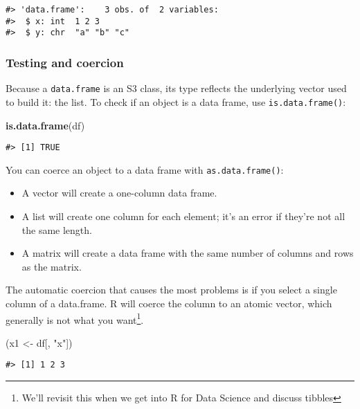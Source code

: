 \documentclass[]{book}
\newenvironment{Shaded}{\begin{snugshade}}{\end{snugshade}}
\newcommand{\KeywordTok}[1]{\textcolor[rgb]{0.13,0.29,0.53}{\textbf{#1}}}
\newcommand{\StringTok}[1]{\textcolor[rgb]{0.31,0.60,0.02}{#1}}
\newcommand{\NormalTok}[1]{#1}
\let\rmarkdownfootnote\footnote%
\def\footnote{\protect\rmarkdownfootnote}
\theoremstyle{definition}
\theoremstyle{definition}
\theoremstyle{definition}
\theoremstyle{remark}
\begin{document}
\begin{verbatim}
#> 'data.frame':    3 obs. of  2 variables:
#>  $ x: int  1 2 3
#>  $ y: chr  "a" "b" "c"
\end{verbatim}

\subsubsection{Testing and coercion}\label{testing-and-coercion}

Because a \texttt{data.frame} is an S3 class, its type reflects the
underlying vector used to build it: the list. To check if an object is a
data frame, use \texttt{is.data.frame()}:

\begin{Shaded}
\begin{Highlighting}[]
\KeywordTok{is.data.frame}\NormalTok{(df)}
\end{Highlighting}
\end{Shaded}

\begin{verbatim}
#> [1] TRUE
\end{verbatim}

You can coerce an object to a data frame with \texttt{as.data.frame()}:

\begin{itemize}
\item
  A vector will create a one-column data frame.
\item
  A list will create one column for each element; it's an error if
  they're not all the same length.
\item
  A matrix will create a data frame with the same number of columns and
  rows as the matrix.
\end{itemize}

The automatic coercion that causes the most problems is if you select a
single column of a data.frame. R will coerce the column to an atomic
vector, which generally is not what you want\footnote{We'll revisit this
  when we get into R for Data Science and discuss tibbles}.

\begin{Shaded}
\begin{Highlighting}[]
\NormalTok{(x1 <-}\StringTok{ }\NormalTok{df[, }\StringTok{"x"}\NormalTok{])}
\end{Highlighting}
\end{Shaded}

\begin{verbatim}
#> [1] 1 2 3
\end{verbatim}
\end{document}

